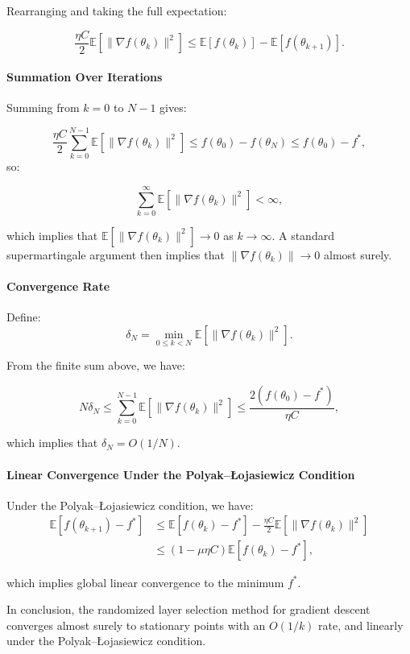 Rearranging and taking the full expectation:

\[
\frac{\eta C}{2} \mathbb{E}[\|\nabla f(\theta_k)\|^2] \le \mathbb{E}[f(\theta_k)] - \mathbb{E}[f(\theta_{k+1})].
\]

\paragraph{Summation Over Iterations}

Summing from \(k = 0\) to \(N - 1\) gives:

\[
\frac{\eta C}{2} \sum_{k=0}^{N-1} \mathbb{E}[\|\nabla f(\theta_k)\|^2] \le f(\theta_0) - f(\theta_N) \le f(\theta_0) - f^*,
\]
so:

\[
\sum_{k=0}^\infty \mathbb{E}[\|\nabla f(\theta_k)\|^2] < \infty,
\]

which implies that \(\mathbb{E}[\|\nabla f(\theta_k)\|^2] \to 0\) as \(k \to \infty\). A standard supermartingale argument then implies that \(\|\nabla f(\theta_k)\| \to 0\) almost surely.

\paragraph{Convergence Rate}

Define:
\[
\delta_N = \min_{0 \le k < N} \mathbb{E}[\|\nabla f(\theta_k)\|^2].
\]

From the finite sum above, we have:

\[
N \delta_N \le \sum_{k=0}^{N-1} \mathbb{E}[\|\nabla f(\theta_k)\|^2] \le \frac{2(f(\theta_0) - f^*)}{\eta C},
\]

which implies that \(\delta_N = O(1/N)\).

\paragraph{Linear Convergence Under the Polyak–Łojasiewicz Condition}
Under the Polyak–Łojasiewicz condition, we have:
\[
\begin{aligned}
\mathbb{E}[f(\theta_{k+1}) - f^*] 
&\le \mathbb{E}[f(\theta_k) - f^*] - \frac{\eta C}{2} \mathbb{E}[\|\nabla f(\theta_k)\|^2] \\
&\le (1 - \mu \eta C) \mathbb{E}[f(\theta_k) - f^*],
\end{aligned}
\]

which implies global linear convergence to the minimum \(f^*\).

In conclusion, the randomized layer selection method for gradient descent converges almost surely to stationary points with an \(O(1/k)\) rate, and linearly under the Polyak–Łojasiewicz condition.

